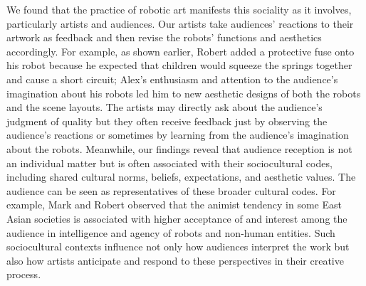 We found that the practice of robotic art manifests this sociality as it involves, particularly artists and audiences. 
Our artists take audiences' reactions to their artwork as feedback and then revise the robots' functions and aesthetics accordingly. 
For example, as shown earlier, Robert added a protective fuse onto his robot because he expected that children would squeeze the springs together and cause a short circuit; Alex's enthusiasm and attention to the audience's imagination about his robots led him to new aesthetic designs of both the robots and the scene layouts. The artists may directly ask about the audience's judgment of quality but they often receive feedback just by observing the audience's reactions or sometimes by learning from the audience's imagination about the robots.
Meanwhile, our findings reveal that audience reception is not an individual matter but is often associated with their sociocultural codes, including shared cultural norms, beliefs, expectations, and aesthetic values. The audience can be seen as representatives of these broader cultural codes. For example, Mark and Robert observed that the animist tendency in some East Asian societies is associated with higher acceptance of and interest among the audience in intelligence and agency of robots and non-human entities. Such sociocultural contexts influence not only how audiences interpret the work but also how artists anticipate and respond to these perspectives in their creative process.

